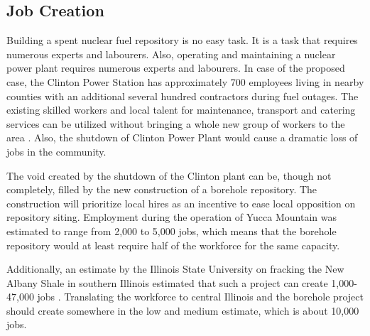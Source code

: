\subsection{Job Creation}



Building a spent nuclear fuel repository is no easy task. It is a task that requires
numerous experts and labourers. Also, operating and maintaining a nuclear power plant
requires numerous experts and labourers. In case of the proposed case, the Clinton
 Power Station has approximately 700 employees living in nearby counties with an
additional several hundred contractors during fuel outages\cite{Exelon}.
The existing skilled workers and local talent for maintenance, transport and catering
services can be utilized without bringing a whole new group of workers to the area \cite{IAEA_2008}. Also, the shutdown of Clinton Power Plant would cause a dramatic
loss of jobs in the community. 




The void created by the shutdown of the Clinton plant can be, though not
completely, filled by the new construction of a borehole repository. The construction
will prioritize local hires as an incentive to ease local opposition on repository
 siting. Employment during the operation of Yucca Mountain was estimated to range from
 2,000 to 5,000 jobs, \cite{Riddel_2003} which means that the borehole repository
 would at least require half of the workforce for the same capacity. 

Additionally, an estimate by the Illinois State University on fracking the New Albany
Shale in southern Illinois estimated that such a project can create 1,000-47,000 jobs
\cite{Loomis_2012}. Translating the workforce to central Illinois and the borehole
project should create somewhere in the low and medium estimate, which is about 10,000
jobs.   


